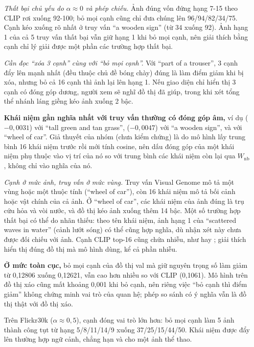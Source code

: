 \textit{Thất bại chủ yếu do $\alpha \approx 0$ và phép chiếu.} Ảnh đúng vốn đứng hạng 7-15 theo CLIP rơi xuống 92-100; bỏ mọi cạnh cũng chỉ đưa chúng lên 96/94/82/34/75. Cạnh kéo xuống rõ nhất ở truy vấn ``a wooden sign'' (từ 34 xuống 92). Ảnh hạng 1 của cả 5 truy vấn thất bại vẫn giữ hạng 1 khi bỏ mọi cạnh, nên giải thích bằng cạnh chỉ lý giải được một phần các trường hợp thất bại.

\textit{Cần đọc ``xóa 3 cạnh'' cùng với ``bỏ mọi cạnh''.} Với ``part of a trouser'', 3 cạnh đẩy lên mạnh nhất (đều thuộc chủ đề bóng chày) đúng là làm điểm giảm khi bị xóa, nhưng bỏ cả 16 cạnh thì ảnh lại lên hạng 1. Nếu giao diện chỉ hiển thị 3 cạnh có đóng góp dương, người xem sẽ nghĩ đồ thị đã giúp, trong khi xét tổng thể nhánh láng giềng kéo ảnh xuống 2 bậc.

\textbf{Khái niệm gần nghĩa nhất với truy vấn thường có đóng góp âm,} ví dụ  ($-0,0031$) với ``tall green and tan grass'',  ($-0,0047$) với ``a wooden sign'',  và  với ``wheel of car''. Giả thuyết của nhóm (chưa kiểm chứng) là do mô hình lấy trung bình 16 khái niệm trước rồi mới tính cosine, nên dấu đóng góp của một khái niệm phụ thuộc vào vị trí của nó so với trung bình các khái niệm còn lại qua $W_{\text{nb}}$, không chỉ vào nghĩa của nó.

\textit{Cạnh ở mức ảnh, truy vấn ở mức vùng.} Truy vấn Visual Genome mô tả một vùng hoặc một thuộc tính (``wheel of car''), còn 16 khái niệm mô tả bối cảnh hoặc vật chính của cả ảnh. Ở ``wheel of car'', các khái niệm của ảnh đúng là trụ cứu hỏa và vòi nước, và đồ thị kéo ảnh xuống thêm 14 bậc. Một số trường hợp thất bại có thể do nhãn thiếu: theo tên khái niệm, ảnh hạng 1 của ``scattered waves in water'' (cảnh lướt sóng) có thể cũng hợp nghĩa, dù nhận xét này chưa được đối chiếu với ảnh. Cạnh CLIP top-16 cũng chứa nhiễu, như  hay ; giải thích hiển thị đúng đồ thị mà mô hình dùng, kể cả phần nhiễu.

\textbf{Ở mức toàn cục,} bỏ mọi cạnh của đồ thị val mà giữ nguyên trọng số làm \mrr{} giảm từ 0,12806 xuống 0,12621, vẫn cao hơn nhiều so với CLIP (0,1061). Mô hình trên đồ thị xáo cũng mất khoảng 0,001 khi bỏ cạnh, nên riêng việc ``bỏ cạnh thì điểm giảm'' không chứng minh vai trò của quan hệ; phép so sánh có ý nghĩa vẫn là đồ thị thật với đồ thị xáo.

Trên Flickr30k ($\alpha \approx 0,5$), cạnh đóng vai trò lớn hơn: bỏ mọi cạnh làm 5 ảnh thành công tụt từ hạng 5/8/11/14/9 xuống 37/25/15/44/50. Khái niệm được đẩy lên thường hợp ngữ cảnh, chẳng hạn  và  cho một ảnh thể thao.

